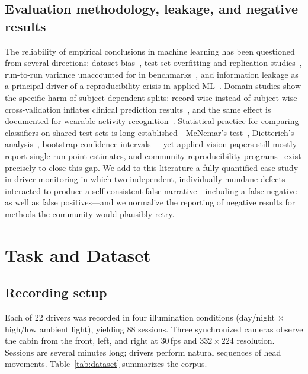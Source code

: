 \documentclass[journal]{IEEEtran}
\begin{document}
\subsection{Evaluation methodology, leakage, and negative results}
The reliability of empirical conclusions in machine learning has been
questioned from several directions: dataset bias~\cite{torralba2011bias},
test-set overfitting and replication studies~\cite{recht2019imagenet,
beyer2020done}, run-to-run variance unaccounted for in
benchmarks~\cite{bouthillier2021accounting}, and information leakage as a
principal driver of a reproducibility crisis in applied
ML~\cite{kapoor2023leakage}.  Domain studies show the specific harm of
subject-dependent splits: record-wise instead of subject-wise
cross-validation inflates clinical prediction results~\cite{saeb2017needs},
and the same effect is documented for wearable activity
recognition~\cite{jordao2018har}.  Statistical practice for comparing
classifiers on shared test sets is long
established---McNemar's test~\cite{mcnemar1947}, Dietterich's
analysis~\cite{dietterich1998}, bootstrap confidence
intervals~\cite{efron1993bootstrap}---yet applied vision papers still
mostly report single-run point estimates, and community reproducibility
programs~\cite{pineau2021reproducibility} exist precisely to close this
gap.  We add to this literature a fully quantified case study in driver
monitoring in which two independent, individually mundane defects
interacted to produce a self-consistent false narrative---including a false
negative as well as false positives---and we normalize the reporting of
negative results for methods the community would plausibly retry.

\section{Task and Dataset}
\label{sec:data}

\subsection{Recording setup}
Each of 22 drivers was recorded in four illumination conditions
(day/night $\times$ high/low ambient light), yielding 88 sessions.  Three
synchronized cameras observe the cabin from the front, left, and right at
30\,fps and $332{\times}224$ resolution.  Sessions are several minutes
long; drivers perform natural sequences of head movements.
Table~\ref{tab:dataset} summarizes the corpus.
\end{document}
